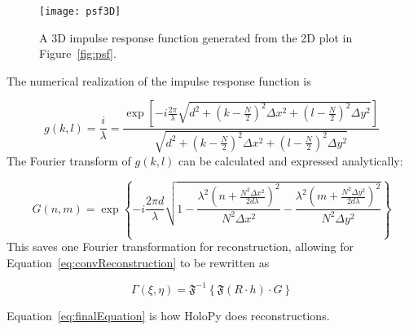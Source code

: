     \begin{figure}[htbp!]
        \begin{center}
            \texttt{[image: psf3D]}
        \end{center}
        \caption{A 3D impulse response function generated from the 2D plot in
            Figure~\ref{fig:psf}.}
            \label{fig:psf3D}
        \end{figure}

    The numerical realization of the impulse response function is

    \begin{equation}
        g(k,l)=\frac{i}{\lambda}=\frac{\exp\left[
        -i\frac{2\pi}{\lambda}\sqrt{d^2+\left(k-\frac{N}{2}\right)^2\Delta x^2+\left(
        l-\frac{N}{2}
    \right)^{2}\Delta y^2} \right]}{\sqrt{d^2+\left(k-\frac{N}{2}\right)^2\Delta x^2+\left(
        l-\frac{N}{2}
    \right)^{2}\Delta y^2}}
    \end{equation}
    The Fourier transform of $g(k,l)$ can be calculated and expressed
    analytically:

    \begin{equation}
        G(n,m) = \exp\left\{ -i\frac{2\pi
        d}{\lambda}\sqrt{1-\frac{\lambda^{2}\left( n+\frac{N^2\Delta
        x^2}{2d\lambda} \right)^2}{N^2\Delta x^2}-\frac{\lambda^{2}\left( m+\frac{N^2\Delta
        y^2}{2d\lambda} \right)^2}{N^2\Delta y^2}} \right\}
    \end{equation}
    This saves one Fourier transformation for reconstruction, allowing for
    Equation~\ref{eq:convReconstruction} to be rewritten as

    \begin{equation}
        \Gamma(\xi,\eta) = \mathfrak{F}^{-1}\left\{ \mathfrak{F}(R\cdot h)
        \cdot G \right\}
        \label{eq:finalEquation}
    \end{equation}

    Equation~\ref{eq:finalEquation} is how HoloPy does reconstructions.










% 
